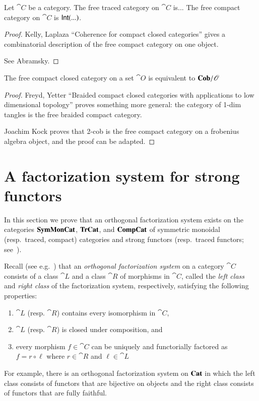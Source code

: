 \documentclass[12pt,oneside,article,draft]{memoir}
\begin{document}
\begin{proposition}\label{prop:free traced and compact}
	Let $\cat{C}$ be a category.
	The free traced category on $\cat{C}$ is...
	The free compact category on $\cat{C}$ is $\mathsf{Int}(...)$.
\end{proposition}
\begin{proof}
	Kelly, Laplaza ``Coherence for compact closed categories'' gives a combinatorial description of the free compact category on one object. 

	See Abramsky. 
\end{proof}

\begin{proposition}\label{prop:free compact is Cob}
	The free compact closed category on a set $\cat{O}$ is equivalent to $\mathbf{Cob}/\mathscr{O}$
\end{proposition}
\begin{proof}
	Freyd, Yetter ``Braided compact closed categories with applications to low dimensional topology'' proves something more general: the category of 1-dim tangles is the free braided compact category. 

	Joachim Kock proves that 2-cob is the free compact category on a frobenius algebra object, and the proof can be adapted.
\end{proof}

\section{A factorization system for strong functors}\label{sec:factorization system}

In this section we prove that an orthogonal factorization system exists on the categories $\mathbf{SymMonCat}$, $\mathbf{TrCat}$, and $\mathbf{CompCat}$ of symmetric monoidal (resp.\ traced, compact) categories and strong functors (resp.\ traced functors; see~\cite{JoyalStreetVerity}). 

Recall (see e.g.~\cite{AdamekHerrlichStrecker}) that an \emph{orthogonal factorization system} on a category $\cat{C}$ consists of a class $\cat{L}$ and a class $\cat{R}$ of morphisms in $\cat{C}$, called the \emph{left class} and \emph{right class} of the factorization system, respectively, satisfying the following properties:
\begin{enumerate}
	\item $\cat{L}$ (resp. $\cat{R}$) contains every isomorphism in $\cat{C}$, 
	\item $\cat{L}$ (resp. $\cat{R}$) is closed under composition, and
	\item every morphism $f\in\cat{C}$ can be uniquely and functorially factored as $f=r\circ\ell$ where $r\in\cat{R}$ and $\ell\in\cat{L}$
\end{enumerate}
For example, there is an orthogonal factorization system on $\mathbf{Cat}$ in which the left class consists of functors that are bijective on objects and the right class consists of functors that are fully faithful. 
\end{document}
